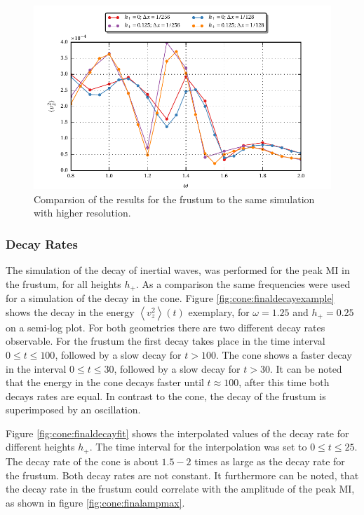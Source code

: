 \begin{figure}[!b]
  \centering
  \includegraphics{gfx/cone/final/hd_comparison.pdf}
  \caption{
      \label{fig:cone:finalhdcomp}
      Comparsion of the results for the frustum to the same simulation with higher resolution.
    }
\end{figure}
\clearpage

\subsubsection{Decay Rates}

The simulation of the decay of inertial waves, was performed for the peak M\RN{1} in the frustum,
for all heights $h_+$.
As a comparison the same frequencies were used for a simulation of the decay in the cone.
Figure \ref{fig:cone:finaldecayexample} shows the decay in the energy  $\left<v_z^2\right>(t)$  exemplary,
for $\omega=1.25$ and $h_+=0.25$ on a semi-log plot.
For both geometries there are two different decay rates observable.
For the frustum the first decay takes place in the time interval $0\leq t\leq 100$,
followed by a slow decay for $t>100$.
The cone shows a faster decay in the interval $0\leq t\leq 30$, followed by a slow decay for $t>30$.
It can be noted that the energy in the cone decays faster until $t\approx100$, after this time
both decays rates are  equal.  In contrast to the cone, the decay of the frustum  is superimposed by an oscillation.

Figure \ref{fig:cone:finaldecayfit} shows the interpolated values of the decay rate for different
heights $h_+$.  The time interval for the interpolation was set to $0 \leq t \leq 25$.
The decay rate of the cone is about $1.5-2$ times as large as the decay rate for the frustum.
Both decay rates are not constant.
It furthermore can be noted, that the decay rate in the frustum could correlate with
the amplitude of the peak M\RN{1}, as shown in figure \ref{fig:cone:finalampmax}.

